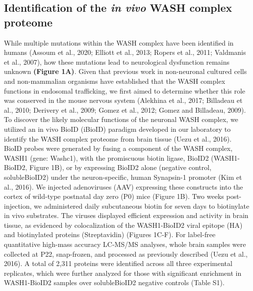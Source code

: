 
\subsection{Identification of the \textit{in vivo} WASH complex proteome}

While multiple mutations within the WASH complex have been identified in humans 
(Assoum et al., 2020; Elliott et al., 2013; Ropers et al., 2011; 
Valdmanis et al., 2007), how these mutations lead to neurological
dysfunction remains unknown \textbf{(Figure 1A)}. Given that previous work in
non-neuronal cultured cells and non-mammalian organisms have established that
the WASH complex functions in endosomal trafficking, we first aimed to determine
whether this role was conserved in the mouse nervous system (Alekhina et al.,
2017; Billadeau et al., 2010; Derivery et al., 2009; Gomez et al., 2012; Gomez
and Billadeau, 2009). To discover the likely molecular functions of the neuronal
WASH complex, we utilized an in vivo BioID (iBioID) paradigm developed in our
laboratory to identify the WASH complex proteome from brain tissue (Uezu et al.,
2016). BioID probes were generated by fusing a component of the WASH complex,
WASH1 (gene: Washc1), with the promiscuous biotin ligase, BioID2 (WASH1-BioID2,
Figure 1B), or by expressing BioID2 alone (negative control, solubleBioID2)
under the neuron-specific, human Synapsin-1 promoter (Kim et al., 2016). We
injected adenoviruses (AAV) expressing these constructs into the cortex of
wild-type postnatal day zero (P0) mice (Figure 1B). Two weeks post-injection, we
administered daily subcutaneous biotin for seven days to biotinylate in vivo
substrates. The viruses displayed efficient expression and activity in brain
tissue, as evidenced by colocalization of the WASH1-BioID2 viral epitope (HA)
and biotinylated proteins (Streptavidin) (Figures 1C-F). For label-free
quantitative high-mass accuracy LC-MS/MS analyses, whole brain samples were
collected at P22, snap-frozen, and processed as previously described (Uezu et
al., 2016). A total of 2,311 proteins were identified across all three
experimental replicates, which were further analyzed for those with significant
enrichment in WASH1-BioID2 samples over solubleBioID2 negative controls (Table
S1). 

